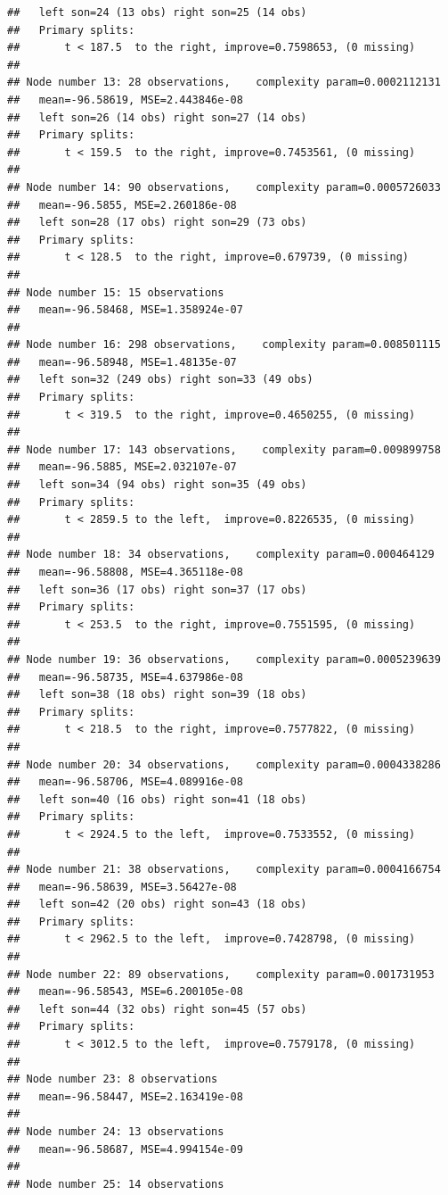 \documentclass[
]{book}
\begin{document}
\begin{verbatim}
##   left son=24 (13 obs) right son=25 (14 obs)
##   Primary splits:
##       t < 187.5  to the right, improve=0.7598653, (0 missing)
## 
## Node number 13: 28 observations,    complexity param=0.0002112131
##   mean=-96.58619, MSE=2.443846e-08 
##   left son=26 (14 obs) right son=27 (14 obs)
##   Primary splits:
##       t < 159.5  to the right, improve=0.7453561, (0 missing)
## 
## Node number 14: 90 observations,    complexity param=0.0005726033
##   mean=-96.5855, MSE=2.260186e-08 
##   left son=28 (17 obs) right son=29 (73 obs)
##   Primary splits:
##       t < 128.5  to the right, improve=0.679739, (0 missing)
## 
## Node number 15: 15 observations
##   mean=-96.58468, MSE=1.358924e-07 
## 
## Node number 16: 298 observations,    complexity param=0.008501115
##   mean=-96.58948, MSE=1.48135e-07 
##   left son=32 (249 obs) right son=33 (49 obs)
##   Primary splits:
##       t < 319.5  to the right, improve=0.4650255, (0 missing)
## 
## Node number 17: 143 observations,    complexity param=0.009899758
##   mean=-96.5885, MSE=2.032107e-07 
##   left son=34 (94 obs) right son=35 (49 obs)
##   Primary splits:
##       t < 2859.5 to the left,  improve=0.8226535, (0 missing)
## 
## Node number 18: 34 observations,    complexity param=0.000464129
##   mean=-96.58808, MSE=4.365118e-08 
##   left son=36 (17 obs) right son=37 (17 obs)
##   Primary splits:
##       t < 253.5  to the right, improve=0.7551595, (0 missing)
## 
## Node number 19: 36 observations,    complexity param=0.0005239639
##   mean=-96.58735, MSE=4.637986e-08 
##   left son=38 (18 obs) right son=39 (18 obs)
##   Primary splits:
##       t < 218.5  to the right, improve=0.7577822, (0 missing)
## 
## Node number 20: 34 observations,    complexity param=0.0004338286
##   mean=-96.58706, MSE=4.089916e-08 
##   left son=40 (16 obs) right son=41 (18 obs)
##   Primary splits:
##       t < 2924.5 to the left,  improve=0.7533552, (0 missing)
## 
## Node number 21: 38 observations,    complexity param=0.0004166754
##   mean=-96.58639, MSE=3.56427e-08 
##   left son=42 (20 obs) right son=43 (18 obs)
##   Primary splits:
##       t < 2962.5 to the left,  improve=0.7428798, (0 missing)
## 
## Node number 22: 89 observations,    complexity param=0.001731953
##   mean=-96.58543, MSE=6.200105e-08 
##   left son=44 (32 obs) right son=45 (57 obs)
##   Primary splits:
##       t < 3012.5 to the left,  improve=0.7579178, (0 missing)
## 
## Node number 23: 8 observations
##   mean=-96.58447, MSE=2.163419e-08 
## 
## Node number 24: 13 observations
##   mean=-96.58687, MSE=4.994154e-09 
## 
## Node number 25: 14 observations

\end{verbatim}
\end{document}
